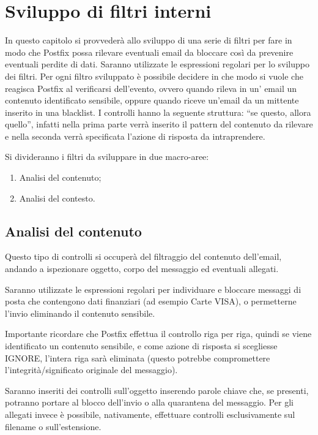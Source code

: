     \section{Sviluppo di filtri interni}
    In questo capitolo si provvederà allo sviluppo di una serie di filtri per fare in modo che Postfix possa 
    rilevare eventuali email da bloccare così da prevenire eventuali perdite di dati. 
    Saranno utilizzate le espressioni regolari per lo sviluppo dei filtri. Per ogni filtro sviluppato è possibile 
    decidere in che modo si vuole che reagisca Postfix al verificarsi dell’evento, 
    ovvero quando rileva in un’ email un contenuto identificato sensibile, oppure quando riceve un’email da un 
    mittente inserito in una blacklist.
    I controlli hanno la seguente struttura: “se questo, allora quello”, 
    infatti nella prima parte verrà inserito il pattern del contenuto da rilevare e nella seconda verrà 
    specificata l’azione di risposta da intraprendere.

    Si divideranno i filtri da sviluppare in due macro-aree:

    \begin{enumerate}
        \item Analisi del contenuto;
        \item Analisi del contesto.
    \end{enumerate}

    \subsection{Analisi del contenuto}
    Questo tipo di controlli si occuperà del filtraggio del contenuto dell'email, 
    andando a ispezionare oggetto, corpo del messaggio ed eventuali allegati. 
    
    Saranno utilizzate le espressioni regolari per individuare e bloccare messaggi di posta che contengono dati
    finanziari (ad esempio Carte VISA), o permetterne l’invio eliminando il contenuto sensibile. 
    
    Importante ricordare che Postfix effettua il controllo riga per riga, quindi se viene identificato un 
    contenuto sensibile, e come azione di risposta si scegliesse IGNORE, 
    l’intera riga sarà eliminata (questo potrebbe compromettere l’integrità/significato originale del messaggio). 
    
    Saranno inseriti dei controlli sull’oggetto inserendo parole chiave che, se presenti, 
    potranno portare al blocco dell’invio o alla quarantena del messaggio. Per gli allegati invece è possibile, nativamente,
    effettuare controlli esclusivamente sul filename o sull’estensione. 

